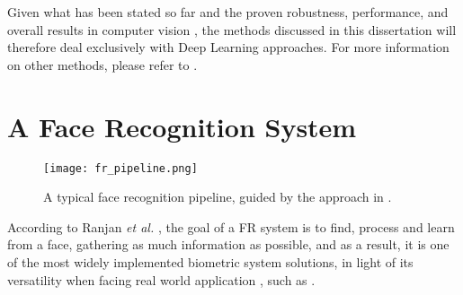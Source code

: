 \documentclass[class=report, crop=false, a4paper, 12pt]{standalone}
\begin{document}
\par Given what has been stated so far and the proven robustness, performance, and overall results in computer vision , the methods discussed in this dissertation will therefore deal exclusively with Deep Learning approaches. For more information on other methods, please refer to \autocite{learned-millerLabeledFacesWild2016}.




\section{A Face Recognition System}

\begin{figure}[!h]
    \texttt{[image: fr\_pipeline.png]}
    \caption[Pipeline]{A typical face recognition pipeline, guided by the approach in \autocite{wangDeepFaceRecognition2021}.}
    \label{fig:fr pipeline}
\end{figure}

\par According to Ranjan \textit{et al.} \autocite{ranjanDeepLearningUnderstanding2018}, the goal of a FR system is to find, process and learn from a face, gathering as much information as possible, and as a result, it is one of the most widely implemented biometric system solutions, in light of its versatility when facing real world application \autocite{duElementsEndtoendDeep2022}, such as .
\end{document}
